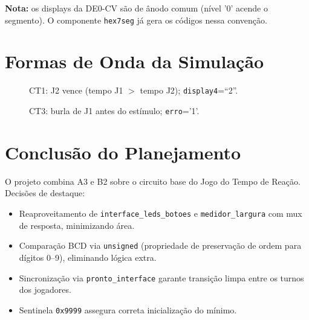 \documentclass[12pt,a4paper]{article}
\begin{document}
\noindent\textbf{Nota:} os displays da DE0-CV são de ânodo comum (nível '0'
acende o segmento). O componente \texttt{hex7seg} já gera os códigos nessa
convenção.

\section{Formas de Onda da Simulação}

\begin{figure}[H]
  \centering
  \caption{CT1: J2 vence (tempo J1 $>$ tempo J2); \texttt{display4}=``2''.}
\end{figure}

\begin{figure}[H]
  \centering
  \caption{CT3: burla de J1 antes do estímulo; \texttt{erro}='1'.}
\end{figure}

\section{Conclusão do Planejamento}

O projeto combina A3 e B2 sobre o circuito base do Jogo do Tempo de Reação.
Decisões de destaque:

\begin{itemize}
  \item Reaproveitamento de \texttt{interface\_leds\_botoes} e
        \texttt{medidor\_largura} com mux de resposta, minimizando área.
  \item Comparação BCD via \texttt{unsigned} (propriedade de preservação de
        ordem para dígitos 0--9), eliminando lógica extra.
  \item Sincronização via \texttt{pronto\_interface} garante transição limpa
        entre os turnos dos jogadores.
  \item Sentinela \texttt{0x9999} assegura correta inicialização do mínimo.
\end{itemize}
\end{document}
